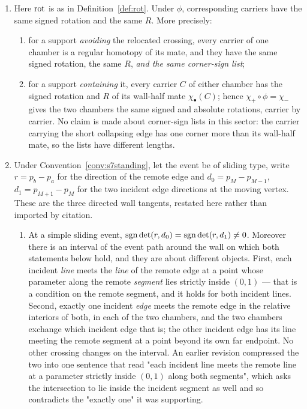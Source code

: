 \begin{lemma}\label{lem:slidingcoeff}
\begin{enumerate}
\item[(A)] Here $\operatorname{rot}$ is as in Definition~\ref{def:rot}.
Under $\phi$, corresponding carriers have the same signed rotation and the same
$R$. More precisely:
\begin{enumerate}
\item[(i)] for a support \emph{avoiding} the relocated crossing, every carrier
of one chamber is a regular homotopy of its mate, and they have the same signed
rotation, the same $R$, \emph{and the same corner-sign list};
\item[(ii)] for a support \emph{containing} it, every carrier $C$ of either
chamber has the signed rotation and $R$ of its wall-half mate
$\chi_\bullet(C)$; hence $\chi_+\circ\phi=\chi_-$ gives the two chambers the same
signed and absolute rotations, carrier by carrier. No claim is made about
corner-sign lists in this sector: the carrier carrying the short collapsing edge
has one corner more than its wall-half mate, so the lists have different lengths.
\end{enumerate}
\item[(B)] Under Convention~\ref{conv:s7standing}, let the event be of sliding type, write
$r=p_b-p_a$ for the direction of the remote edge and $d_0=p_M-p_{M-1}$,
$d_1=p_{M+1}-p_M$ for the two incident edge directions at the moving vertex. These are the three directed wall tangents, restated
here rather than imported by citation.
\begin{enumerate}
\item[(i)] At a simple sliding event, $\operatorname{sgn}\det(r,d_0)=\operatorname{sgn}\det(r,d_1)\neq0$. Moreover
there is an interval of the event path around the wall on which both statements
below hold, and they are about different objects. First, each incident
\emph{line} meets the \emph{line} of the remote edge at a point whose parameter
along the remote \emph{segment} lies strictly inside $(0,1)$ --- that is a
condition on the remote segment, and it holds for both incident lines. Second,
exactly one incident \emph{edge} meets the remote edge in the relative interiors
of both, in each of the two chambers, and the two chambers exchange which
incident edge that is; the other incident edge has its line meeting the remote
segment at a point beyond its own far endpoint. No other crossing changes on the
interval. An earlier revision compressed the two into one sentence that read
"each incident line meets the remote line at a parameter strictly inside $(0,1)$
along both segments", which asks the intersection to lie inside the incident
segment as well and so contradicts the "exactly one" it was supporting.


\end{enumerate}
\end{enumerate}
\end{lemma}
